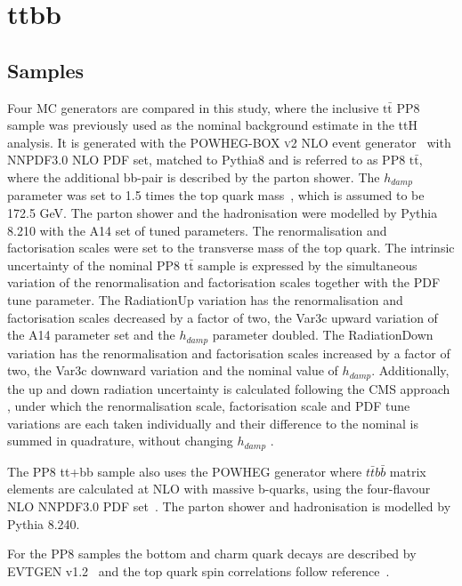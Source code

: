 \section{ttbb}
\label{sec:ttbb}

\subsection{Samples}
Four MC generators are compared in this study, where the inclusive $\mathrm{t\bar{t}}$ PP8 sample was previously used as the nominal background estimate in the ttH analysis. It is generated with the \textsc{POWHEG-BOX v2} NLO event generator~\cite{Nason:2004rx,Frixione:2007vw,Alioli:2010xd,Campbell:2014kua} with NNPDF3.0 NLO PDF set, matched to Pythia8 and is referred to as PP8 $\mathrm{t\bar{t}}$, where the additional bb-pair is described by the parton shower. The $h_{damp}$ parameter was set to 1.5 times the top quark mass~\cite{ATL-PHYS-PUB-2016-020}, which is assumed to be 172.5 GeV. The parton shower and the hadronisation were modelled by Pythia 8.210 with the A14 set of tuned parameters. The renormalisation and factorisation scales were set to the transverse mass of the top quark.
The intrinsic uncertainty of the nominal PP8 $\mathrm{t\bar{t}}$ sample is expressed by the simultaneous variation of the renormalisation and factorisation scales together with the PDF tune parameter. The RadiationUp variation has the renormalisation and factorisation scales decreased by a factor of two, the Var3c upward variation of the A14 parameter set and the $h_{damp}$ parameter doubled. The RadiationDown variation has the renormalisation and factorisation scales increased by a factor of two, the Var3c downward variation and the nominal value of $h_{damp}$.
Additionally, the up and down radiation uncertainty is calculated following the CMS approach , under which the renormalisation scale, factorisation scale and PDF tune variations are each taken individually and their difference to the nominal is summed in quadrature, without changing $h_{damp}$ .

The PP8 tt+bb sample also uses the POWHEG generator where $t\bar{t}b\bar{b}$ matrix elements are calculated at NLO with massive b-quarks, using the four-flavour NLO NNPDF3.0 PDF set~\cite{Jezo:2018yaf}. The parton shower and hadronisation is modelled by Pythia 8.240.

For the PP8 samples the bottom and charm quark decays are described by EVTGEN v1.2~\cite{LANGE2001152} and the top quark spin correlations follow reference~\cite{Frixione:2007zp}.


